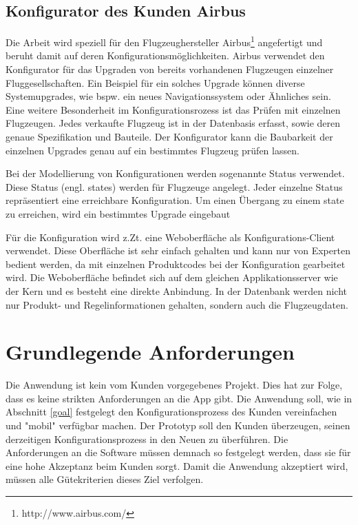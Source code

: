\subsection{Konfigurator des Kunden Airbus} \label{airbusConfigurator}
Die Arbeit wird speziell für den Flugzeughersteller Airbus\footnote{http://www.airbus.com/} angefertigt und beruht damit auf deren Konfigurationsmöglichkeiten. Airbus verwendet den Konfigurator für das Upgraden von bereits vorhandenen Flugzeugen einzelner Fluggesellschaften. Ein Beispiel für ein solches Upgrade können diverse Systemupgrades, wie bspw. ein neues Navigationssystem oder Ähnliches sein. Eine weitere Besonderheit im Konfigurationsrozess ist das Prüfen mit einzelnen Flugzeugen. Jedes verkaufte Flugzeug ist in der Datenbasis erfasst, sowie deren genaue Spezifikation und Bauteile. Der Konfigurator kann die Baubarkeit der einzelnen Upgrades genau auf ein bestimmtes Flugzeug prüfen lassen. \par

 Bei der Modellierung von Konfigurationen werden sogenannte Status verwendet. Diese Status (engl. states) werden für Flugzeuge angelegt. Jeder einzelne Status repräsentiert eine erreichbare Konfiguration. Um einen Übergang zu einem state zu erreichen, wird ein bestimmtes Upgrade eingebaut  
 \par

Für die Konfiguration wird z.Zt. eine Weboberfläche als Konfigurations-Client verwendet. Diese Oberfläche ist sehr einfach gehalten und kann nur von Experten bedient werden, da mit einzelnen Produktcodes bei der Konfiguration gearbeitet wird. Die Weboberfläche befindet sich auf dem gleichen Applikationsserver wie der Kern und es besteht eine direkte Anbindung. In der Datenbank werden nicht nur Produkt- und Regelinformationen gehalten, sondern auch die Flugzeugdaten. 

  
\section{Grundlegende Anforderungen}
Die Anwendung ist kein vom Kunden vorgegebenes Projekt. Dies hat zur Folge, dass es keine strikten Anforderungen an die App gibt. Die Anwendung soll, wie in Abschnitt \ref{goal} festgelegt den Konfigurationsprozess des Kunden vereinfachen und "mobil" verfügbar machen. Der Prototyp soll den Kunden überzeugen, seinen derzeitigen Konfigurationsprozess in den Neuen zu überführen. Die Anforderungen an die Software müssen demnach so festgelegt werden, dass sie für eine hohe Akzeptanz beim Kunden sorgt. Damit die Anwendung akzeptiert wird, müssen alle Gütekriterien dieses Ziel verfolgen. \par

